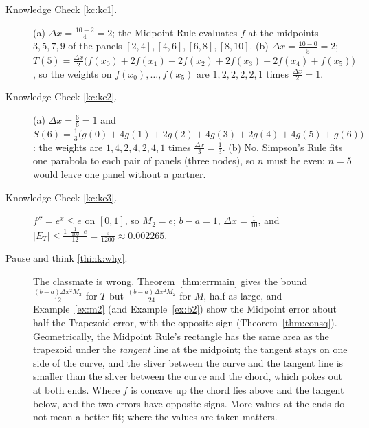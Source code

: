 \documentclass[11pt]{article}
\begin{document}
\begin{description}
  \item[Knowledge Check \ref{kc:kc1}.] (a) $\Delta x=\frac{10-2}4=2$; the Midpoint Rule evaluates $f$ at the midpoints $3,5,7,9$ of the panels $[2,4],[4,6],[6,8],[8,10]$. (b) $\Delta x=\frac{10-0}5=2$; $T(5)=\frac{\Delta x}2\bigl(f(x_0)+2f(x_1)+2f(x_2)+2f(x_3)+2f(x_4)+f(x_5)\bigr)$, so the weights on $f(x_0),\ldots,f(x_5)$ are $1,2,2,2,2,1$ times $\frac{\Delta x}2=1$.

  \item[Knowledge Check \ref{kc:kc2}.] (a) $\Delta x=\frac66=1$ and $S(6)=\frac13\bigl(g(0)+4g(1)+2g(2)+4g(3)+2g(4)+4g(5)+g(6)\bigr)$: the weights are $1,4,2,4,2,4,1$ times $\frac{\Delta x}3=\frac13$. (b) No. Simpson's Rule fits one parabola to each pair of panels (three nodes), so $n$ must be even; $n=5$ would leave one panel without a partner.

  \item[Knowledge Check \ref{kc:kc3}.] $f''=e^x\le e$ on $[0,1]$, so $M_2=e$; $b-a=1$, $\Delta x=\frac1{10}$, and $\lvert E_T\rvert\le\frac{1\cdot\frac1{100}\cdot e}{12}=\frac e{1200}\approx0.002265$.

  \item[Pause and think \ref{think:why}.] The classmate is wrong. Theorem~\ref{thm:errmain} gives the bound $\frac{(b-a)\Delta x^2M_2}{12}$ for $T$ but $\frac{(b-a)\Delta x^2M_2}{24}$ for $M$, half as large, and Example~\ref{ex:m2} (and Example~\ref{ex:b2}) show the Midpoint error about half the Trapezoid error, with the opposite sign (Theorem~\ref{thm:consq}). Geometrically, the Midpoint Rule's rectangle has the same area as the trapezoid under the \emph{tangent} line at the midpoint; the tangent stays on one side of the curve, and the sliver between the curve and the tangent line is smaller than the sliver between the curve and the chord, which pokes out at both ends. Where $f$ is concave up the chord lies above and the tangent below, and the two errors have opposite signs. More values at the ends do not mean a better fit; where the values are taken matters.


\end{description}
\end{document}
